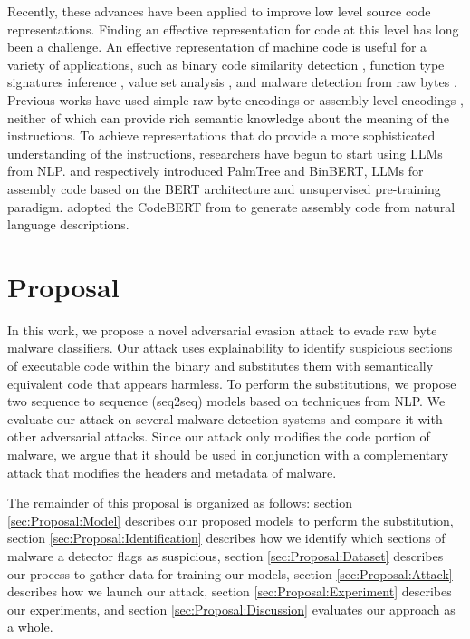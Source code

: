 \documentclass[conference]{IEEEtran}
\begin{document}
Recently, these advances have been applied to improve low level source code representations. Finding an effective representation for code at this level has long been a challenge. An effective representation of machine code is useful for a variety of applications, such as binary code similarity detection \cite{xu2017neural}, function type signatures inference \cite{chua2017neural}, value set analysis \cite{guo2019deepvsa}, and malware detection from raw bytes \cite{raff2018malware, raff2021classifying}. Previous works have used simple raw byte encodings \cite{guo2019deepvsa} or assembly-level encodings \cite{xu2017neural}, neither of which can provide rich semantic knowledge about the meaning of the instructions. To achieve representations that do provide a more sophisticated understanding of the instructions, researchers have begun to start using LLMs from NLP. \cite{li2021palmtree} and \cite{artuso2022binbert} respectively introduced PalmTree and BinBERT, LLMs for assembly code based on the BERT \cite{devlin2018bert} architecture and unsupervised pre-training paradigm. \cite{liguori2022can} adopted the CodeBERT from \cite{feng2020codebert} to generate assembly code from natural language descriptions.

\section{Proposal}
\label{sec:Proposal}

In this work, we propose a novel adversarial evasion attack to evade raw byte malware classifiers. Our attack uses explainability to identify suspicious sections of executable code within the binary and substitutes them with semantically equivalent code that appears harmless. To perform the substitutions, we propose two sequence to sequence (seq2seq) models based on techniques from NLP. We evaluate our attack on several malware detection systems and compare it with other adversarial attacks. Since our attack only modifies the code portion of malware, we argue that it should be used in conjunction with a complementary attack that modifies the headers and metadata of malware. 

The remainder of this proposal is organized as follows: section \ref{sec:Proposal:Model} describes our proposed models to perform the substitution, section \ref{sec:Proposal:Identification} describes how we identify which sections of malware a detector flags as suspicious, section \ref{sec:Proposal:Dataset} describes our process to gather data for training our models, section \ref{sec:Proposal:Attack} describes how we launch our attack, section \ref{sec:Proposal:Experiment} describes our experiments, and section \ref{sec:Proposal:Discussion} evaluates our approach as a whole.
\end{document}
